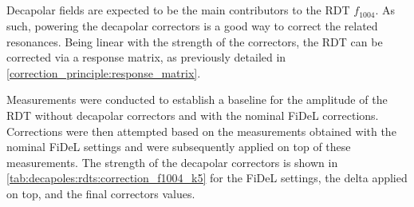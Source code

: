 \subsection{}
\label{section:decapoles:decapolar_contribution_correction}

Decapolar fields are expected to be the main contributors to the RDT $f_{1004}$. As such, powering
the decapolar correctors is a good way to correct the related resonances.
Being linear with the strength of the correctors, the RDT can be corrected via a response matrix,
as previously detailed in \cref{correction_principle:response_matrix}.

Measurements were conducted to establish a baseline for the amplitude of the RDT without decapolar
correctors and with the nominal FiDeL corrections. Corrections were then attempted based on the
measurements obtained with the nominal FiDeL settings and were subsequently applied on top of these
measurements.
%
The strength of the decapolar correctors is shown in \cref{tab:decapoles:rdts:correction_f1004_k5}
for the FiDeL settings, the delta applied on top, and the final correctors values.


